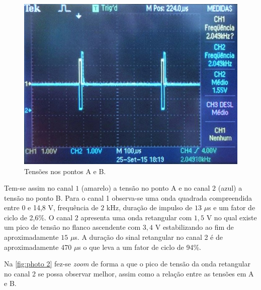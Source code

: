 \documentclass[a4paper,11pt]{article}
\numberwithin{equation}{section}
\begin{document}
\begin{figure}[h]
	\centering
	\includegraphics[keepaspectratio=true, scale=0.55]{img/fig4}
	\caption{Tensões nos pontos A e B.}
	\label{fig:photo 1}
	\vspace{-0.8em}
\end{figure}

Tem-se assim no canal $1$ (amarelo) a tensão no ponto A e no canal $2$ (azul) a tensão no ponto B. Para o canal 1 observa-se uma onda quadrada compreendida entre 0 e 14,8 V, frequência de $2$ kHz, duração de impulso de $13$ $\mu$s e um fator de ciclo de 2,6\%. O canal $2$ apresenta uma onda retangular com $1,5$ V no qual existe um pico de tensão no flanco ascendente com $3,4$ V estabilizando ao fim de aproximadamente $15$ $\mu$s. A duração do sinal retangular no canal 2 é de aproximadamente 470 $\mu$s o que leva a um fator de ciclo de 94\%. 

Na \autoref{fig:photo 2} fez-se \textit{zoom} de forma a que o pico de tensão da onda retangular no canal 2 se possa observar melhor, assim como a relação entre as tensões em A e B.

\pagebreak
\end{document}
